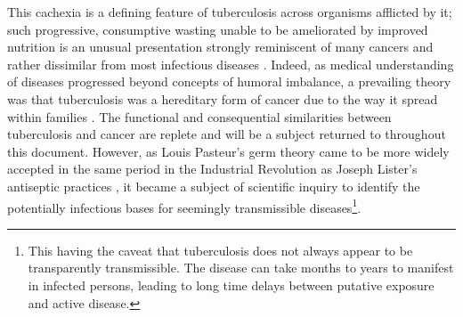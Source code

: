 This cachexia is a defining feature of tuberculosis across organisms afflicted by it; such progressive, consumptive wasting unable to be ameliorated by improved nutrition is an unusual presentation strongly reminiscent of many cancers and rather dissimilar from most infectious diseases \citep{Tisdale2002, Silva1988, Martignoni2003, Chang2013}. Indeed, as medical understanding of diseases progressed beyond concepts of humoral imbalance, a prevailing theory was that tuberculosis was a hereditary form of cancer due to the way it spread within families \citep{Frith2014}. The functional and consequential similarities between tuberculosis and cancer are replete and will be a subject returned to throughout this document. However, as Louis Pasteur's germ theory \citep{Smith2012} came to be more widely accepted in the same period in the Industrial Revolution as Joseph Lister's antiseptic practices \citep{ToledoPereyra2010}, it became a subject of scientific inquiry to identify the potentially infectious bases for seemingly transmissible diseases\footnote{This having the caveat that tuberculosis does not always appear to be transparently transmissible. The disease can take months to years to manifest in infected persons, leading to long time delays between putative exposure and active disease\citep{Behr2018}.}. 

